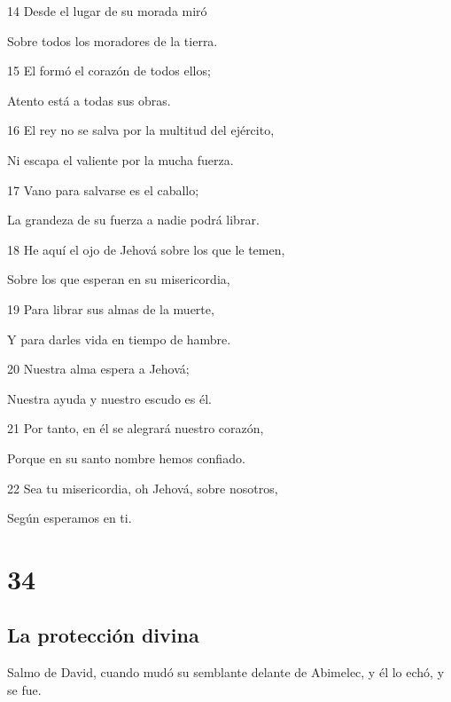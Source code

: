 \par 14 Desde el lugar de su morada miró
\par Sobre todos los moradores de la tierra.
\par 15 El formó el corazón de todos ellos;
\par Atento está a todas sus obras.
\par 16 El rey no se salva por la multitud del ejército,
\par Ni escapa el valiente por la mucha fuerza.
\par 17 Vano para salvarse es el caballo;
\par La grandeza de su fuerza a nadie podrá librar.
\par 18 He aquí el ojo de Jehová sobre los que le temen,
\par Sobre los que esperan en su misericordia,
\par 19 Para librar sus almas de la muerte,
\par Y para darles vida en tiempo de hambre.
\par 20 Nuestra alma espera a Jehová;
\par Nuestra ayuda y nuestro escudo es él.
\par 21 Por tanto, en él se alegrará nuestro corazón,
\par Porque en su santo nombre hemos confiado.
\par 22 Sea tu misericordia, oh Jehová, sobre nosotros,
\par Según esperamos en ti.

\chapter{34}

\section*{La protección divina}

\par Salmo de David, cuando mudó su semblante delante de Abimelec,  y él lo echó, y se fue.

